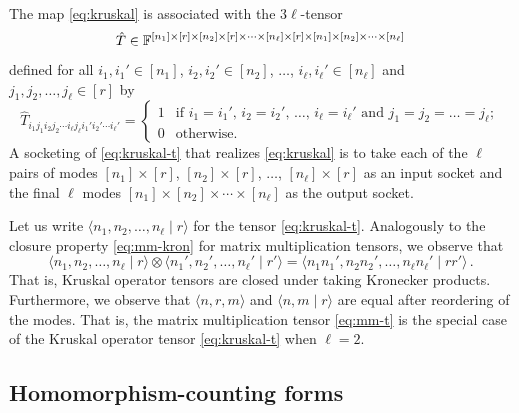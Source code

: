 \documentclass{toc}
\newcommand{\bra}{\ensuremath{\langle}}
\newcommand{\ket}{\ensuremath{\rangle}}
\newcommand{\F}{\ensuremath{\mathbb{F}}}
\begin{document}
The map \eqref{eq:kruskal} is associated with the $3\ell$-tensor
\[
\hat{T}\in\F^{%
[n_1]\times [r]\times
[n_2]\times [r]\times
\cdots \times
[n_\ell]\times [r]\times
[n_1]\times [n_2]\times\cdots\times [n_\ell]}
\]
defined for all
$i_1,i_1'\in [n_1]$,
$i_2,i_2'\in [n_2]$,
$\ldots$,
$i_\ell,i_\ell'\in [n_\ell]$
and
$j_1,j_2,\ldots,j_\ell\in [r]$
by
\begin{equation}
\label{eq:kruskal-t}
\hat{T}_{i_1j_1i_2j_2\cdots i_\ell j_\ell i_1'i_2'\cdots i_\ell'}=
\begin{cases}
1 & \text{if $i_1=i_1'$, $i_2=i_2'$, $\ldots$, $i_\ell=i_\ell'$ and $j_1=j_2=\ldots=j_\ell$};\\
0 & \text{otherwise}.
\end{cases}
\end{equation}
A socketing of \eqref{eq:kruskal-t} that realizes \eqref{eq:kruskal}
is to take each of the $\ell$ pairs of modes
$[n_1]\times[r]$, $[n_2]\times[r]$, $\ldots$, $[n_\ell]\times [r]$
as an input socket and the final $\ell$ modes
$[n_1]\times [n_2]\times\cdots\times[n_\ell]$ as the output socket.

%
%
Let us write $\bra n_1,n_2,\ldots,n_\ell \mid r\ket$ for the tensor
%
\eqref{eq:kruskal-t}. Analogously to the closure property \eqref{eq:mm-kron}
for matrix multiplication tensors, we observe that
\begin{equation}
\label{eq:kruskal-kron}
%
%
%
\bra n_1,n_2,\ldots,n_\ell\mid r\ket
\otimes
%
%
\bra n_1',n_2',\ldots,n_\ell' \mid r'\ket
%
=
%
%
\bra n_1n_1',n_2n_2',\ldots,n_\ell n_\ell' \mid rr'\ket\,.
%
\end{equation}
That is, Kruskal operator tensors are closed under taking Kronecker products.
Furthermore, we observe that $\bra n,r,m\ket$ and %
%
$\bra n,m \mid r\ket$ are equal after
%
 reordering of the modes. That is, the
matrix multiplication tensor \eqref{eq:mm-t} is the special case
of the Kruskal operator tensor \eqref{eq:kruskal-t} when $\ell=2$.


\subsection{Homomorphism-counting forms}

\label{sect:binom}
\end{document}
